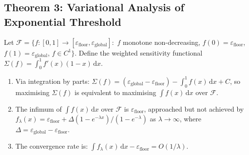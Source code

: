 \subsection{Theorem 3: Variational Analysis of Exponential
Threshold}
\label{sec:arxiv-thm-3}


\begin{theorem}
\label{thm:arxiv-variational}
Let $\mathcal{F} = \{f : [0, 1] \to [\varepsilon_{\mathrm{floor}},
\varepsilon_{\mathrm{global}}]:$ $f$ monotone non-decreasing,
$f(0) = \varepsilon_{\mathrm{floor}}$,
$f(1) = \varepsilon_{\mathrm{global}}$, $f \in C^1\}$. Define the
weighted sensitivity functional
$\Sigma(f) = \int_0^1 f'(x)(1 - x)\,\mathrm{d}x$.

\begin{enumerate}
\item[(i)] Via integration by parts:
$\Sigma(f) = (\varepsilon_{\mathrm{global}} -
\varepsilon_{\mathrm{floor}}) - \int_0^1 f(x)\,\mathrm{d}x + C$,
so maximising $\Sigma(f)$ is equivalent to maximising
$\int f(x)\,\mathrm{d}x$ over $\mathcal{F}$.

\item[(ii)] The infimum of $\int f(x)\,\mathrm{d}x$ over
$\mathcal{F}$ is $\varepsilon_{\mathrm{floor}}$, approached but not
achieved by
$f_\lambda(x) = \varepsilon_{\mathrm{floor}} +
\Delta(1 - e^{-\lambda x}) / (1 - e^{-\lambda})$ as $\lambda \to
\infty$, where $\Delta = \varepsilon_{\mathrm{global}} -
\varepsilon_{\mathrm{floor}}$.

\item[(iii)] The convergence rate is:
$\int f_\lambda(x)\,\mathrm{d}x - \varepsilon_{\mathrm{floor}} =
O(1 / \lambda)$.
\end{enumerate}
\end{theorem}

